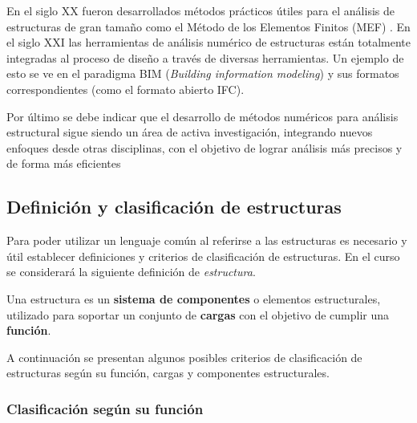 En el siglo XX fueron desarrollados métodos prácticos útiles para el análisis de estructuras de gran tamaño como el Método de los Elementos Finitos (MEF) \citep{Zienkiewicz1972}. %
%
En el siglo XXI las herramientas de análisis numérico de estructuras están totalmente integradas al proceso de diseño a través de diversas herramientas. Un ejemplo de esto se ve en el paradigma BIM (\emph{Building information modeling}) y sus formatos correspondientes (como el formato abierto IFC). 

Por último se debe indicar que el desarrollo de métodos numéricos para análisis estructural sigue siendo un área de activa investigación, integrando nuevos enfoques desde otras disciplinas, con el objetivo de lograr análisis más precisos y de forma más eficientes \citep{forets}


\subsection{Definición y clasificación de estructuras}

% 
Para poder utilizar un lenguaje común al referirse a las estructuras es necesario y útil establecer definiciones y criterios de clasificación de estructuras. %
%
En el curso se considerará la siguiente definición de \textit{estructura}.

{Una estructura es un \textbf{sistema de componentes} o elementos estructurales, utilizado para soportar un conjunto de \textbf{cargas} con el objetivo de cumplir una \textbf{función}.}

A continuación se presentan algunos posibles criterios de clasificación de estructuras según su función, cargas y componentes estructurales. %
%


\subsubsection{Clasificación según su función}

